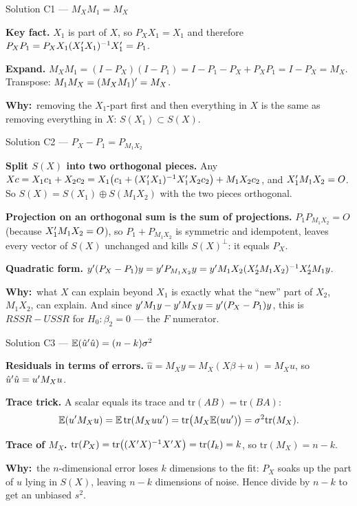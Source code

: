 \documentclass[11pt]{article}
\newcommand{\step}[1]{\par\smallskip\noindent\textbf{\textcolor{qnavy}{#1}}\quad\ignorespaces}
\newcommand{\Why}{\textbf{\textcolor{whyline}{Why:}}\ }
\begin{document}
\begin{solbox}{Solution C1 --- $M_{X}M_{1} = M_{X}$}
\step{Key fact.} $X_{1}$ is part of $X$, so $P_{X}X_{1} = X_{1}$ and therefore
$P_{X}P_{1} = P_{X}X_{1}(X_{1}^{\prime} X_{1})^{-1}X_{1}^{\prime} = P_{1}$.
\step{Expand.} $M_{X}M_{1} = (I - P_{X})(I - P_{1}) = I - P_{1} - P_{X} + P_{X}P_{1} = I - P_{X} = M_{X}$.
Transpose: $M_{1}M_{X} = (M_{X}M_{1})^{\prime} = M_{X}$.
\begin{why}\Why removing the $X_{1}$-part first and then everything in $X$ is the same as
removing everything in $X$: $S(X_{1}) \subset S(X)$.\end{why}
\end{solbox}

\begin{solbox}{Solution C2 --- $P_{X} - P_{1} = P_{M_{1}X_{2}}$}
\step{Split $S(X)$ into two orthogonal pieces.} Any $Xc = X_{1}c_{1} + X_{2}c_{2}
= X_{1}\big(c_{1} + (X_{1}^{\prime} X_{1})^{-1}X_{1}^{\prime} X_{2}c_{2}\big) + M_{1}X_{2}c_{2}$, and
$X_{1}^{\prime} M_{1}X_{2} = O$. So $S(X) = S(X_{1}) \oplus S(M_{1}X_{2})$ with the two pieces orthogonal.
\step{Projection on an orthogonal sum is the sum of projections.} $P_{1}P_{M_{1}X_{2}} = O$
(because $X_{1}^{\prime} M_{1}X_{2} = O$), so $P_{1} + P_{M_{1}X_{2}}$ is symmetric and idempotent,
leaves every vector of $S(X)$ unchanged and kills $S(X)^{\perp}$: it equals $P_{X}$.
\step{Quadratic form.}
$y^{\prime}(P_{X} - P_{1})y = y^{\prime} P_{M_{1}X_{2}}y = y^{\prime} M_{1}X_{2}(X_{2}^{\prime} M_{1}X_{2})^{-1}X_{2}^{\prime} M_{1}y$.
\begin{why}\Why what $X$ can explain beyond $X_{1}$ is exactly what the ``new'' part of
$X_{2}$, $M_{1}X_{2}$, can explain. And since $y^{\prime} M_{1}y - y^{\prime} M_{X}y = y^{\prime}(P_{X} - P_{1})y$,
this is $RSSR - USSR$ for $H_{0}: \beta_{2} = 0$ --- the $F$ numerator.\end{why}
\end{solbox}

\begin{solbox}{Solution C3 --- $\mathbb{E}(\hat u^{\prime}\hat u) = (n-k)\sigma^{2}$}
\step{Residuals in terms of errors.} $\hat u = M_{X}y = M_{X}(X\beta + u) = M_{X}u$, so
$\hat u^{\prime}\hat u = u^{\prime} M_{X}u$.
\step{Trace trick.} A scalar equals its trace and $\mathrm{tr}(AB) = \mathrm{tr}(BA)$:
\[
  \mathbb{E}(u^{\prime} M_{X}u) = \mathbb{E}\,\mathrm{tr}(M_{X}uu^{\prime}) = \mathrm{tr}\big(M_{X}\mathbb{E}(uu^{\prime})\big)
  = \sigma^{2}\mathrm{tr}(M_{X}).
\]
\step{Trace of $M_{X}$.} $\mathrm{tr}(P_{X}) = \mathrm{tr}\big((X^{\prime} X)^{-1}X^{\prime} X\big) = \mathrm{tr}(I_{k}) = k$,
so $\mathrm{tr}(M_{X}) = n - k$.
\begin{why}\Why the $n$-dimensional error loses $k$ dimensions to the fit: $P_{X}$ soaks
up the part of $u$ lying in $S(X)$, leaving $n-k$ dimensions of noise. Hence divide by
$n-k$ to get an unbiased $s^{2}$.\end{why}
\end{solbox}
\end{document}
